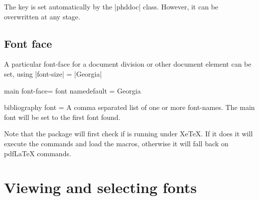 The key is set automatically by the |phddoc| class. However, it can be overwritten at any stage.

\subsection{Font face}
 A particular font-face for a document division or other document element can be set, using |font-size| = |Georgia|

\begin{docKey}{main font-face}{= font name}{default = Georgia} 
\end{docKey}


\begin{docKey}[phd] {bibliography font}{ = } {}
A comma separated list of one or more font-names. The main font will be set to the first font found.
\end{docKey}

Note that the package will first check if is running under XeTeX. If it does it will execute the commands and load the macros, otherwise it will fall back on pdfLaTeX commands.

\section{Viewing and selecting fonts}

